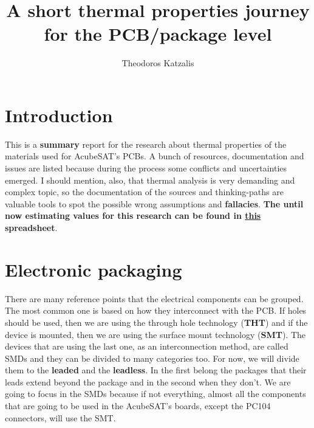 \documentclass[final]{cubedoc}
\title{A short thermal properties journey for the PCB/package level} %
\author{Theodoros Katzalis}
\begin{document}
	
	\section{Introduction}
	
	This is a \textbf{summary} report for the research about thermal properties of the materials used for AcubeSAT's PCBs. A bunch of resources, documentation and issues are listed because during the process some conflicts and uncertainties emerged. I should mention, also, that thermal analysis is very demanding and complex topic, so the documentation of the sources and thinking-paths are valuable tools to spot the possible wrong assumptions and \textbf{fallacies}. \textbf{The until now estimating values for this research can be found in \href{https://drive.google.com/open?id=1gGPhBZe94Yt7D8FDdGNza4ZnG0pRfhT0xG7Z2tBdK7o}{this} spreadsheet}.
	
	
	
	
	
	\section{Electronic packaging}
	
	There are many reference points that the electrical components can be grouped. The most common one is based on how they interconnect with the PCB. If holes should be used, then we are using the through hole technology (\textbf{THT}) and if the device is mounted, then we are using the surface mount technology (\textbf{SMT}). The devices that are using the last one, as an interconnection method, are called SMDs and they can be divided to many categories too. For now, we will divide them to the \textbf{leaded} and the \textbf{leadless}. In the first belong the packages that their leads extend beyond the package and in the second when they don't. We are going to focus in the SMDs because if not everything, almost all the components that are going to be used in the AcubeSAT's boards, except the PC104 connectors, will use the SMT. 
	
\end{document}
